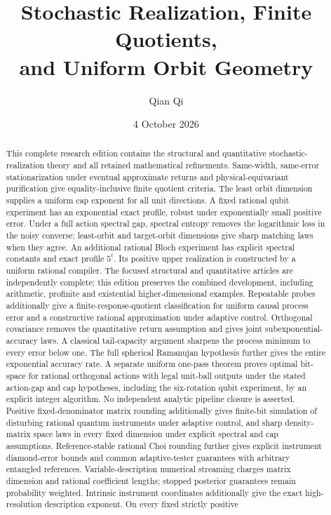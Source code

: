 \documentclass[11pt]{amsart}
\title[Stochastic realization and orbit geometry]{Stochastic Realization, Finite Quotients,\\and Uniform Orbit Geometry}
\author{Qian Qi}
\date{4 October 2026}
\numberwithin{equation}{section}
\theoremstyle{definition}\newtheorem{definition}[theorem]{Definition}
\theoremstyle{remark}\newtheorem{remark}[theorem]{Remark}
\begin{document}
\raggedbottom
\begin{abstract}
This complete research edition contains the structural and quantitative
stochastic-realization theory and all retained mathematical refinements.
Same-width, same-error stationarization under eventual approximate returns
and physical-equivariant purification give equality-inclusive finite
quotient criteria. The least orbit dimension supplies a uniform cap
exponent for all unit directions. A fixed rational qubit experiment has
an exponential exact profile, robust under exponentially small positive
error. Under a full action spectral gap, spectral entropy removes the logarithmic loss in the noisy
converse; least-orbit and target-orbit dimensions give sharp matching
laws when they agree. An additional rational Bloch experiment has
explicit spectral constants and exact profile $5^t$. Its positive upper realization is constructed by a uniform
rational compiler. The focused structural and quantitative articles are
independently complete; this edition preserves the combined development,
including arithmetic, profinite and existential higher-dimensional
examples. Repeatable probes additionally give a finite-response-quotient
classification for uniform causal process error and a constructive
rational approximation under adaptive control. Orthogonal covariance removes the quantitative return assumption and
gives joint subexponential-accuracy laws. A classical tail-capacity
argument sharpens the process minimum to every error below one.
The full spherical Ramanujan hypothesis further gives the entire
exponential accuracy rate. A separate uniform one-pass theorem proves
optimal bit-space for rational orthogonal actions with legal unit-ball
outputs under the stated action-gap and cap hypotheses, including the
six-rotation qubit experiment, by an explicit
integer algorithm. No independent analytic pipeline closure is asserted.
Positive fixed-denominator matrix rounding additionally gives
finite-bit simulation of disturbing rational quantum instruments
under adaptive control, and sharp density-matrix space laws in every
fixed dimension under explicit spectral and cap assumptions.
Reference-stable rational Choi rounding further gives explicit
instrument diamond-error bounds and common adaptive-tester guarantees
with arbitrary entangled references. Variable-description numerical
streaming charges matrix dimension and rational coefficient lengths;
stopped posterior guarantees remain probability weighted.
Intrinsic instrument coordinates additionally give the exact
high-resolution description exponent. On every fixed strictly positive

\end{abstract}
\end{document}
